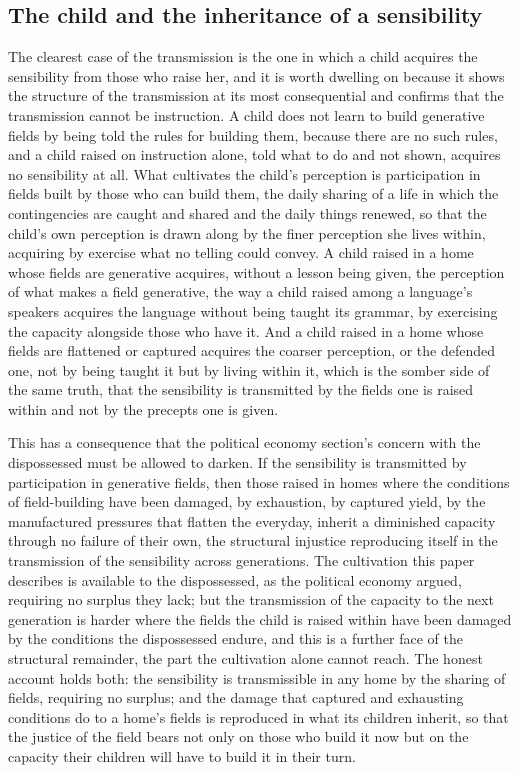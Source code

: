 \subsection{The child and the inheritance of a sensibility}
\label{p22:sub:trans-child}

The clearest case of the transmission is the one in which a child acquires the sensibility from those who raise her, and it is worth dwelling on because it shows the structure of the transmission at its most consequential and confirms that the transmission cannot be instruction. A child does not learn to build generative fields by being told the rules for building them, because there are no such rules, and a child raised on instruction alone, told what to do and not shown, acquires no sensibility at all. What cultivates the child's perception is participation in fields built by those who can build them, the daily sharing of a life in which the contingencies are caught and shared and the daily things renewed, so that the child's own perception is drawn along by the finer perception she lives within, acquiring by exercise what no telling could convey. A child raised in a home whose fields are generative acquires, without a lesson being given, the perception of what makes a field generative, the way a child raised among a language's speakers acquires the language without being taught its grammar, by exercising the capacity alongside those who have it. And a child raised in a home whose fields are flattened or captured acquires the coarser perception, or the defended one, not by being taught it but by living within it, which is the somber side of the same truth, that the sensibility is transmitted by the fields one is raised within and not by the precepts one is given.

This has a consequence that the political economy section's concern with the dispossessed must be allowed to darken. If the sensibility is transmitted by participation in generative fields, then those raised in homes where the conditions of field-building have been damaged, by exhaustion, by captured yield, by the manufactured pressures that flatten the everyday, inherit a diminished capacity through no failure of their own, the structural injustice reproducing itself in the transmission of the sensibility across generations. The cultivation this paper describes is available to the dispossessed, as the political economy argued, requiring no surplus they lack; but the transmission of the capacity to the next generation is harder where the fields the child is raised within have been damaged by the conditions the dispossessed endure, and this is a further face of the structural remainder, the part the cultivation alone cannot reach. The honest account holds both: the sensibility is transmissible in any home by the sharing of fields, requiring no surplus; and the damage that captured and exhausting conditions do to a home's fields is reproduced in what its children inherit, so that the justice of the field bears not only on those who build it now but on the capacity their children will have to build it in their turn.


